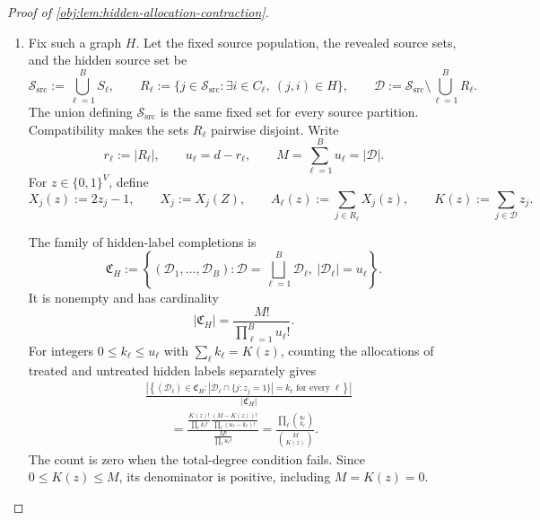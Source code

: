 \begin{proof}[Proof of \cref{obj:lem:hidden-allocation-contraction}]
\begin{enumerate}
Define the response reference measure on \(\mathbb R^B\) by
\[
\nu_{\mathrm{resp}}(dy)
:=
\prod_{\ell=1}^B g_d(y_\ell)\,dy_\ell.
\]
Each \(g_d\) is a probability density, being a finite mixture of translates of the baseline density in \cref{obj:lem:block-law}. Thus
\[
Q_H=\mu_{\mathrm{ass}}\otimes\nu_{\mathrm{resp}}.
\]
Every realized retained graph is compatible with its sampled source partition. Positive graph atoms therefore admit compatible partitions, and they exhaust the graph marginal almost surely. All graphwise constructions below concern these atoms; auxiliary graph functions are extended by zero at null atoms.

\item Fix such a graph \(H\). Let the fixed source population, the revealed source sets, and the hidden source set be
\[
\mathcal S_{\mathrm{src}}:=\bigcup_{\ell=1}^B S_\ell,
\qquad
R_\ell:=\{j\in\mathcal S_{\mathrm{src}}:
\exists i\in C_\ell,\ (j,i)\in H\},
\qquad
\mathcal D:=\mathcal S_{\mathrm{src}}\setminus\bigcup_{\ell=1}^B R_\ell.
\]
The union defining \(\mathcal S_{\mathrm{src}}\) is the same fixed set for every source partition. Compatibility makes the sets \(R_\ell\) pairwise disjoint. Write
\[
r_\ell:=|R_\ell|,
\qquad
u_\ell=d-r_\ell,
\qquad
M=\sum_{\ell=1}^B u_\ell=|\mathcal D|.
\]
For \(z\in\{0,1\}^V\), define
\[
X_j(z):=2z_j-1,
\qquad
X_j:=X_j(Z),
\qquad
A_\ell(z):=\sum_{j\in R_\ell}X_j(z),
\qquad
K(z):=\sum_{j\in\mathcal D}z_j.
\]

The family of hidden-label completions is
\[
\mathfrak C_H
:=
\left\{
(\mathcal D_1,\ldots,\mathcal D_B):
\mathcal D=\bigsqcup_{\ell=1}^B\mathcal D_\ell,\
|\mathcal D_\ell|=u_\ell
\right\}.
\]
It is nonempty and has cardinality
\[
|\mathfrak C_H|=\frac{M!}{\prod_{\ell=1}^B u_\ell!}.
\]
For integers \(0\le k_\ell\le u_\ell\) with
\(\sum_\ell k_\ell=K(z)\), counting the allocations of treated and untreated hidden labels separately gives
\[
\begin{aligned}
&\frac{
\left|
\left\{
(\mathcal D_\ell)\in\mathfrak C_H:
|\mathcal D_\ell\cap\{j:z_j=1\}|=k_\ell
\text{ for every }\ell
\right\}
\right|
}{|\mathfrak C_H|}
\\
&\qquad=
\frac{
\displaystyle
\frac{K(z)!}{\prod_\ell k_\ell!}
\frac{(M-K(z))!}{\prod_\ell(u_\ell-k_\ell)!}
}{
\displaystyle
\frac{M!}{\prod_\ell u_\ell!}
}
=
\frac{\prod_\ell\binom{u_\ell}{k_\ell}}{\binom M{K(z)}}.
\end{aligned}
\]
The count is zero when the total-degree condition fails. Since \(0\le K(z)\le M\), its denominator is positive, including \(M=K(z)=0\).


\end{enumerate}
\end{proof}
